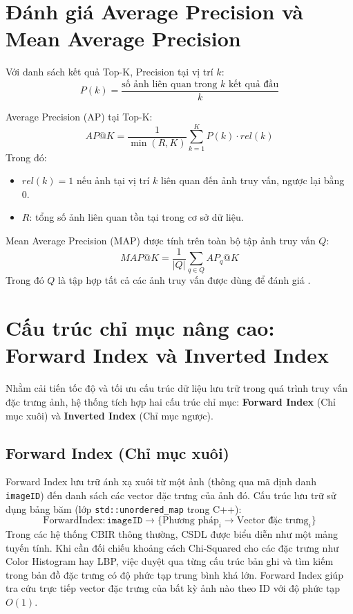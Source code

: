 \section{Đánh giá Average Precision và Mean Average Precision}
Với danh sách kết quả Top-K, Precision tại vị trí $k$:
\begin{equation}
P(k) = \frac{\text{số ảnh liên quan trong } k \text{ kết quả đầu}}{k}
\end{equation}

Average Precision (AP) tại Top-K:
\begin{equation}
AP@K = \frac{1}{\min(R, K)} \sum_{k=1}^{K} P(k) \cdot rel(k)
\end{equation}
Trong đó:
\begin{itemize}
    \item $rel(k) = 1$ nếu ảnh tại vị trí $k$ liên quan đến ảnh truy vấn, ngược lại bằng 0.
    \item $R$: tổng số ảnh liên quan tồn tại trong cơ sở dữ liệu.
\end{itemize}

Mean Average Precision (MAP) được tính trên toàn bộ tập ảnh truy vấn $Q$:
\begin{equation}
MAP@K = \frac{1}{|Q|} \sum_{q \in Q} AP_q@K
\end{equation}
Trong đó $Q$ là tập hợp tất cả các ảnh truy vấn được dùng để đánh giá \cite{manning2008introduction}.

\section{Cấu trúc chỉ mục nâng cao: Forward Index và Inverted Index}
Nhằm cải tiến tốc độ và tối ưu cấu trúc dữ liệu lưu trữ trong quá trình truy vấn đặc trưng ảnh, hệ thống tích hợp hai cấu trúc chỉ mục: \textbf{Forward Index} (Chỉ mục xuôi) và \textbf{Inverted Index} (Chỉ mục ngược).

\subsection{Forward Index (Chỉ mục xuôi)}
Forward Index lưu trữ ánh xạ xuôi từ một ảnh (thông qua mã định danh \texttt{imageID}) đến danh sách các vector đặc trưng của ảnh đó. Cấu trúc lưu trữ sử dụng bảng băm (lớp \texttt{std::unordered\_map} trong C++):
\begin{equation}
\text{ForwardIndex}: \texttt{imageID} \to \{ \text{Phương pháp}_i \to \text{Vector đặc trưng}_i \}
\end{equation}
Trong các hệ thống CBIR thông thường, CSDL được biểu diễn như một mảng tuyến tính. Khi cần đối chiếu khoảng cách Chi-Squared cho các đặc trưng như Color Histogram hay LBP, việc duyệt qua từng cấu trúc bản ghi và tìm kiếm trong bản đồ đặc trưng có độ phức tạp trung bình khá lớn. Forward Index giúp tra cứu trực tiếp vector đặc trưng của bất kỳ ảnh nào theo ID với độ phức tạp $O(1)$.

